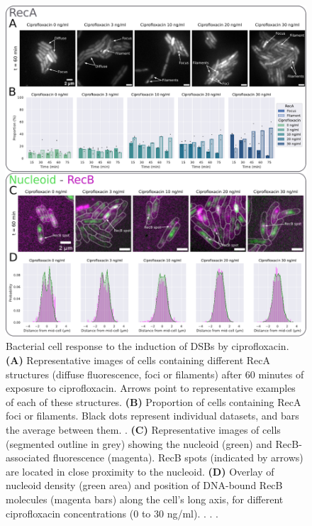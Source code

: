 \begin{figure}[htbp]
    \centering
    \includegraphics[width=.8\textwidth]{Figures/Fig3_cell_response.pdf}
    \caption{Bacterial cell response to the induction of DSBs by ciprofloxacin. \textbf{(A)} Representative images of cells containing different RecA structures (diffuse fluorescence, foci or filaments) after 60 minutes of exposure to ciprofloxacin. Arrows point to representative examples of each of these structures. \textbf{(B)} Proportion of cells containing RecA foci or filaments. Black dots represent individual datasets, and bars the average between them. . \textbf{(C)} Representative images of cells (segmented outline in grey) showing the nucleoid (green) and RecB-associated fluorescence (magenta). RecB spots (indicated by arrows) are located in close proximity to the nucleoid. \textbf{(D)} Overlay of nucleoid density (green area) and position of DNA-bound RecB molecules (magenta bars) along the cell's long axis, for different ciprofloxacin concentrations (0 to 30 ng/ml). . . .}
    \label{Fig:reca_nucleoid}
\end{figure}


